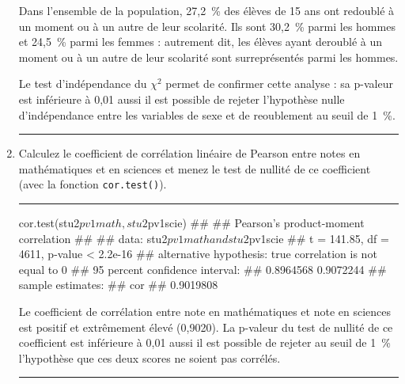 \documentclass[12pt,twosided, notitlepage]{book}
\newenvironment{Shaded}{}{}
\newcommand{\KeywordTok}[1]{\textcolor[rgb]{0.00,0.00,1.00}{#1}}
\newcommand{\OperatorTok}[1]{#1}
\newcommand{\NormalTok}[1]{#1}
\newif \ifsol
\renewenvironment{Shaded}{\begin{snugshade}}{\end{snugshade}}
\begin{document}
\begin{enumerate}
  Dans l'ensemble de la population, 27,2~\% des élèves de 15 ans ont
  redoublé à un moment ou à un autre de leur scolarité. Ils sont 30,2~\%
  parmi les hommes et 24,5~\% parmi les femmes : autrement dit, les
  élèves ayant deroublé à un moment ou à un autre de leur scolarité sont
  surreprésentés parmi les hommes.

  Le test d'indépendance du \(\chi^2\) permet de confirmer cette analyse
  : sa p-valeur est inférieure à 0,01 aussi il est possible de rejeter
  l'hypothèse nulle d'indépendance entre les variables de sexe et de
  reoublement au seuil de 1~\%.

  \begin{center} \rule{0.5\linewidth}{\linethickness}\end{center}

  \bigskip  \fi 
\item
  Calculez le coefficient de corrélation linéaire de Pearson entre notes
  en mathématiques et en sciences et menez le test de nullité de ce
  coefficient (avec la fonction
  \texttt{cor.test()}).

  \ifsol 

  \begin{center} \rule{0.5\linewidth}{\linethickness}\end{center}

\begin{Shaded}
\begin{Highlighting}[]
\KeywordTok{cor.test}\NormalTok{(stu2}\OperatorTok{$}\NormalTok{pv1math, stu2}\OperatorTok{$}\NormalTok{pv1scie)}
\NormalTok{  ## }
\NormalTok{  ##    Pearson's product-moment correlation}
\NormalTok{  ## }
\NormalTok{  ## data:  stu2$pv1math and stu2$pv1scie}
\NormalTok{  ## t = 141.85, df = 4611, p-value < 2.2e-16}
\NormalTok{  ## alternative hypothesis: true correlation is not equal to 0}
\NormalTok{  ## 95 percent confidence interval:}
\NormalTok{  ##  0.8964568 0.9072244}
\NormalTok{  ## sample estimates:}
\NormalTok{  ##       cor }
\NormalTok{  ## 0.9019808}
\end{Highlighting}
\end{Shaded}

  Le coefficient de corrélation entre note en mathématiques et note en
  sciences est positif et extrêmement élevé (0,9020). La p-valeur du
  test de nullité de ce coefficient est inférieure à 0,01 aussi il est
  possible de rejeter au seuil de 1~\% l'hypothèse que ces deux scores
  ne soient pas corrélés.

  \begin{center} \rule{0.5\linewidth}{\linethickness}\end{center}


\end{enumerate}
\end{document}
